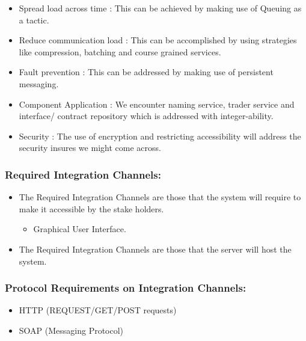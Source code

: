 \documentclass[11pt]{article}
\begin{document}
			\begin{itemize}			
			
				\item Spread load across time : This can be achieved by making use of Queuing as a tactic.
				\item Reduce communication load : This can be accomplished by using strategies like compression, batching and course grained services.
				\item  Fault prevention : This can be addressed by making use of persistent messaging.
				\item Component Application  : We encounter naming service, trader service and interface/ contract repository which is addressed with integer-ability.
				\item  Security : The use of encryption and restricting accessibility will address the security insures we might come across.
			
			\end{itemize}
			
			\subsubsection{Required Integration Channels:}
			\begin{itemize}			
			
				\item The Required Integration Channels are those that the system will require to make it accessible by the stake holders.
				\begin{itemize}			
			
					\item Graphical User Interface.
				
				\end{itemize}	
			
				\item The Required Integration Channels are those that the server will host the system.
			\end{itemize}	
			\subsubsection{Protocol Requirements on Integration Channels:}
			\begin{itemize}			
			
				\item HTTP (REQUEST/GET/POST requests)
				\item SOAP (Messaging Protocol)
				
			\end{itemize}	
			
\end{document}
